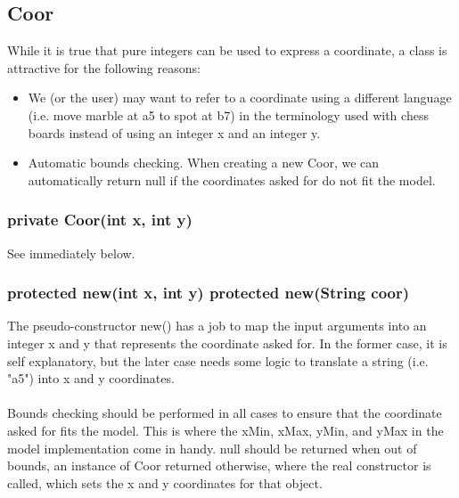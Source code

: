 \documentclass{article}
\begin{document}
\subsection{Coor}
While it is true that pure integers can be used to express a coordinate, a class is attractive for the following reasons:
\begin{itemize}
\item We (or the user) may want to refer to a coordinate using a different language (i.e. move marble at a5 to spot at b7) in the terminology used with chess boards instead of using an integer x and an integer y.
\item Automatic bounds checking. When creating a new Coor, we can automatically return null if the coordinates asked for do not fit the model.
\end{itemize}


\subsubsection*{private Coor(int x, int y)}
See immediately below.

\subsubsection*{protected new(int x, int y) protected new(String coor)}
The pseudo-constructor new() has a job to map the input arguments into an integer x and y that represents the coordinate asked for. In the former case, it is self explanatory, but the later case needs some logic to translate a string (i.e. "a5") into x and y coordinates.\\\\

Bounds checking should be performed in all cases to ensure that the coordinate asked for fits the model. This is where the xMin, xMax, yMin, and yMax in the model implementation come in handy. null should be returned when out of bounds, an instance of Coor returned otherwise, where the real constructor is called, which sets the x and y coordinates for that object.
\end{document}
